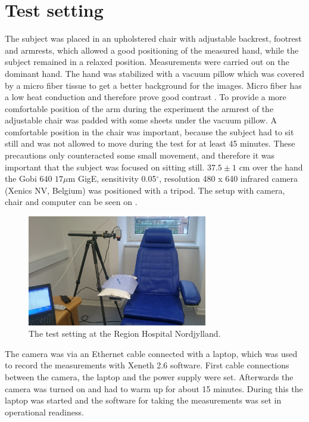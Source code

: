 \section{Test setting}

The subject was placed in an upholstered chair with adjustable backrest, footrest and armrests, which allowed a good positioning of the measured hand, while the subject remained in a relaxed position. Measurements were carried out on the dominant hand. The hand was stabilized with a vacuum pillow which was covered by a micro fiber tissue to get a better background for the images. Micro fiber has a low heat conduction and therefore prove good contrast \cite{schacher2000}. To provide a more comfortable position of the arm during the experiment the armrest of the adjustable chair was padded with some sheets under the vacuum pillow. A comfortable position in the chair was important, because the subject had to sit still and was not allowed to move during the test for at least 45 minutes. These precautions only counteracted some small movement, and therefore it was important that the subject was focused on sitting still. 
$37.5\pm 1$ cm over the hand the Gobi $640$ $17\mu$m GigE, sensitivity 0.05$^\circ$, resolution 480 x 640 infrared camera (Xenics NV, Belgium) was positioned with a tripod. The setup with camera, chair and computer can be seen on . 


\begin{figure}[H]
	\includegraphics[width=0.7\textwidth]{figures/setting}
	\caption{The test setting at the Region Hospital Nordjylland.}
	\label{fig:setting}
\end{figure}

The camera was via an Ethernet cable connected with a laptop, which was used to record the measurements with Xeneth 2.6 software. 
First cable connections between the camera, the laptop and the power supply were set. Afterwards the camera was turned on and had to warm up for about 15 minutes. During this the laptop was started and the software for taking the measurements was set in operational readiness.

